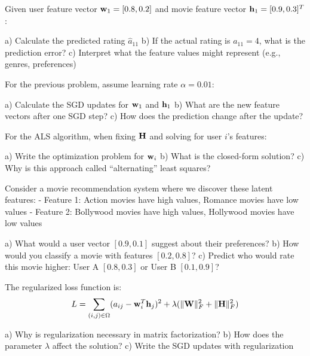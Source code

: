 \documentclass{article}
\begin{document}
\begin{problembox}[title=Prediction Calculation]

Given user feature vector $\mathbf{w}_1 = [0.8, 0.2]$ and movie feature vector $\mathbf{h}_1 = [0.9, 0.3]^T$:

a) Calculate the predicted rating $\hat{a}_{11}$
b) If the actual rating is $a_{11} = 4$, what is the prediction error?
c) Interpret what the feature values might represent (e.g., genres, preferences)
\end{problembox}

\begin{problembox}[title=SGD Update Step]

For the previous problem, assume learning rate $\alpha = 0.01$:

a) Calculate the SGD updates for $\mathbf{w}_1$ and $\mathbf{h}_1$
b) What are the new feature vectors after one SGD step?
c) How does the prediction change after the update?
\end{problembox}

\begin{problembox}[title=ALS Formulation]

For the ALS algorithm, when fixing $\mathbf{H}$ and solving for user $i$'s features:

a) Write the optimization problem for $\mathbf{w}_i$
b) What is the closed-form solution?
c) Why is this approach called ``alternating'' least squares?
\end{problembox}

\begin{problembox}[title=Latent Feature Interpretation]

Consider a movie recommendation system where we discover these latent features:
- Feature 1: Action movies have high values, Romance movies have low values
- Feature 2: Bollywood movies have high values, Hollywood movies have low values

a) What would a user vector $[0.9, 0.1]$ suggest about their preferences?
b) How would you classify a movie with features $[0.2, 0.8]$?
c) Predict who would rate this movie higher: User A $[0.8, 0.3]$ or User B $[0.1, 0.9]$?
\end{problembox}

\begin{problembox}[title=Regularization in Matrix Factorization]

The regularized loss function is:
$$L = \sum_{(i,j) \in \Omega} (a_{ij} - \mathbf{w}_i^T \mathbf{h}_j)^2 + \lambda(\|\mathbf{W}\|_F^2 + \|\mathbf{H}\|_F^2)$$

a) Why is regularization necessary in matrix factorization?
b) How does the parameter $\lambda$ affect the solution?
c) Write the SGD updates with regularization
\end{problembox}
\end{document}
